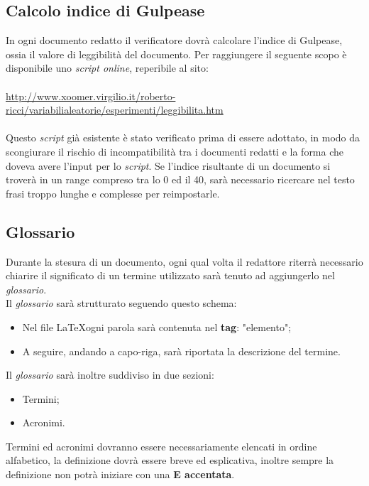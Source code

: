 \subsection{Calcolo indice di Gulpease}
In ogni documento redatto il verificatore dovrà calcolare l'indice di Gulpease, ossia il valore di leggibilità del documento.
Per raggiungere il seguente scopo è disponibile uno \textit{script online}, reperibile al sito:\\
\\
\href{http://xoomer.virgilio.it/roberto-ricci/variabilialeatorie/esperimenti/leggibilita.htm}{http://www.xoomer.virgilio.it/roberto-ricci/variabilialeatorie/esperimenti/leggibilita.htm}
\\ \\
Questo \textit{script} già esistente è stato verificato prima di essere adottato, in modo da scongiurare il rischio di incompatibilità tra i documenti redatti e la forma che doveva avere l'input per lo \textit{script}.
Se l'indice risultante di un documento si troverà in un range compreso tra lo 0 ed il 40, sarà necessario ricercare nel testo frasi troppo lunghe e complesse per reimpostarle.


\subsection{Glossario}
Durante la stesura di un documento, ogni qual volta il redattore riterrà necessario chiarire il significato di un termine utilizzato sarà tenuto ad aggiungerlo nel \textit{glossario}.\\
Il \textit{glossario} sarà strutturato seguendo questo schema:
\begin{itemize}
\item Nel file \LaTeX ogni parola sarà contenuta nel \textbf{tag}: "elemento";
\item A seguire, andando a capo-riga, sarà riportata la descrizione del termine.
\end{itemize}
Il \textit{glossario} sarà inoltre suddiviso in due sezioni:
\begin{itemize}
\item Termini;
\item Acronimi.
\end{itemize}
Termini ed acronimi dovranno essere necessariamente elencati in ordine alfabetico, la definizione dovrà essere breve ed esplicativa, inoltre sempre la definizione non potrà iniziare con una \textbf{E accentata}.